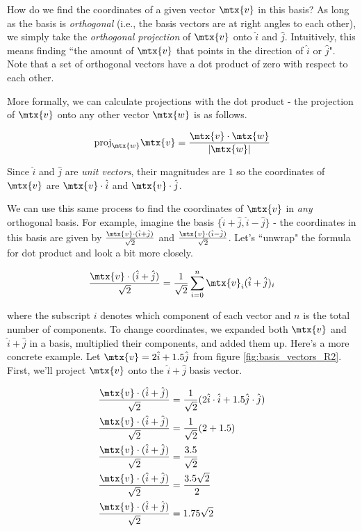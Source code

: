 How do we find the coordinates of a given vector $\mtx{v}$ in this basis? As
long as the basis is \textit{orthogonal} (i.e., the basis vectors are at right
angles to each other), we simply take the \textit{orthogonal projection} of
$\mtx{v}$ onto $\hat{i}$ and $\hat{j}$. Intuitively, this means finding ``the
amount of $\mtx{v}$ that points in the direction of $\hat{i}$ or $\hat{j}$".
Note that a set of orthogonal vectors have a dot product of zero with respect to
each other.

More formally, we can calculate projections with the dot product - the
projection of $\mtx{v}$ onto any other vector $\mtx{w}$ is as follows.

\begin{equation*}
  \text{proj}_\mtx{w} \mtx{v} = \frac{\mtx{v} \cdot \mtx{w}}{|\mtx{w}|}
\end{equation*}

Since $\hat{i}$ and $\hat{j}$ are \textit{unit vectors}, their magnitudes are
$1$ so the coordinates of $\mtx{v}$ are $\mtx{v} \cdot \hat{i}$ and
$\mtx{v} \cdot \hat{j}$.

We can use this same process to find the coordinates of $\mtx{v}$ in
\textit{any} orthogonal basis. For example, imagine the basis
$\{\hat{i} + \hat{j}, \hat{i} - \hat{j}\}$ - the coordinates in this basis are
given by $\frac{\mtx{v} \cdot (\hat{i} + \hat{j})}{\sqrt{2}}$ and
$\frac{\mtx{v} \cdot (\hat{i} - \hat{j})}{\sqrt{2}}$. Let's ``unwrap" the
formula for dot product and look a bit more closely.

\begin{equation*}
  \frac{\mtx{v} \cdot (\hat{i} + \hat{j})}{\sqrt{2}} =
    \frac{1}{\sqrt{2}} \sum_{i=0}^n \mtx{v}_i (\hat{i} + \hat{j})_i
\end{equation*}

where the subscript $i$ denotes which component of each vector and $n$ is the
total number of components. To change coordinates, we expanded both $\mtx{v}$
and $\hat{i} + \hat{j}$ in a basis, multiplied their components, and added them
up. Here's a more concrete example. Let $\mtx{v} = 2\hat{i} + 1.5\hat{j}$ from
figure \ref{fig:basis_vectors_R2}. First, we'll project $\mtx{v}$ onto the
$\hat{i} + \hat{j}$ basis vector.

\begin{align*}
  \frac{\mtx{v} \cdot (\hat{i} + \hat{j})}{\sqrt{2}} &=
    \frac{1}{\sqrt{2}} (2\hat{i} \cdot \hat{i} + 1.5\hat{j} \cdot \hat{j}) \\
  \frac{\mtx{v} \cdot (\hat{i} + \hat{j})}{\sqrt{2}} &=
    \frac{1}{\sqrt{2}} (2 + 1.5) \\
  \frac{\mtx{v} \cdot (\hat{i} + \hat{j})}{\sqrt{2}} &= \frac{3.5}{\sqrt{2}} \\
  \frac{\mtx{v} \cdot (\hat{i} + \hat{j})}{\sqrt{2}} &= \frac{3.5\sqrt{2}}{2} \\
  \frac{\mtx{v} \cdot (\hat{i} + \hat{j})}{\sqrt{2}} &= 1.75\sqrt{2}
\end{align*}

